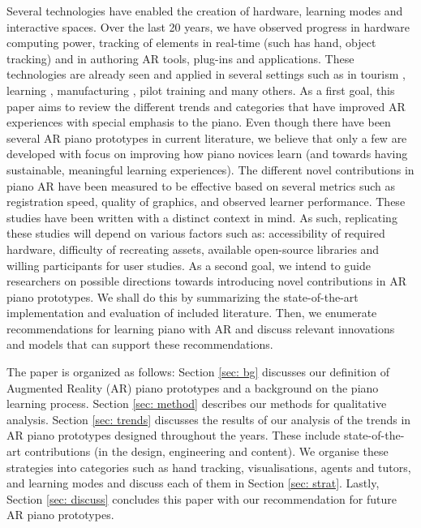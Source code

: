 \documentclass[sigchi, review]{acmart}
\begin{document}
Several technologies have enabled the creation of hardware, learning modes and interactive spaces. Over the last 20 years, we have observed progress in hardware computing power, tracking of elements in real-time (such has hand, object tracking) and in authoring AR tools, plug-ins and applications. These technologies are already seen and applied in several settings such as in tourism \cite{kounavis2012enhancing}, learning \cite{santos2013augmented}, manufacturing \cite{thomas1992augmented}, pilot training \cite{macchiarella2004augmented} and many others. As a first goal, this paper aims to review the different trends and categories that have improved AR experiences with special emphasis to the piano. Even though there have been several AR piano prototypes in current literature, we believe that only a few are developed with focus on improving how piano novices learn (and towards having sustainable, meaningful learning experiences). The different novel contributions in piano AR have been measured to be effective based on several metrics such as registration speed, quality of graphics, and observed learner performance. These studies have been written with a distinct context in mind. As such, replicating these studies will depend on various factors such as: accessibility of required hardware, difficulty of recreating assets, available open-source libraries and willing participants for user studies. As a second goal, we intend to guide researchers on possible directions towards introducing novel contributions in AR piano prototypes. We shall do this by summarizing the state-of-the-art implementation and evaluation of included literature. Then, we enumerate recommendations for learning piano with AR and discuss relevant innovations and models that can support these recommendations. 

The paper is organized as follows: Section \ref{sec: bg}  discusses our definition of Augmented Reality (AR) piano prototypes and a background on the piano learning process. Section \ref{sec: method} describes our methods for qualitative analysis. Section \ref{sec: trends} discusses the results of our analysis of the trends in AR piano prototypes designed throughout the years. These include state-of-the-art contributions (in the design, engineering and content). We organise these strategies into categories such as hand tracking, visualisations, agents and tutors, and learning modes and discuss each of them in Section \ref{sec: strat}. Lastly, Section \ref{sec: discuss} concludes this paper with our recommendation for future AR piano prototypes. 
\end{document}
